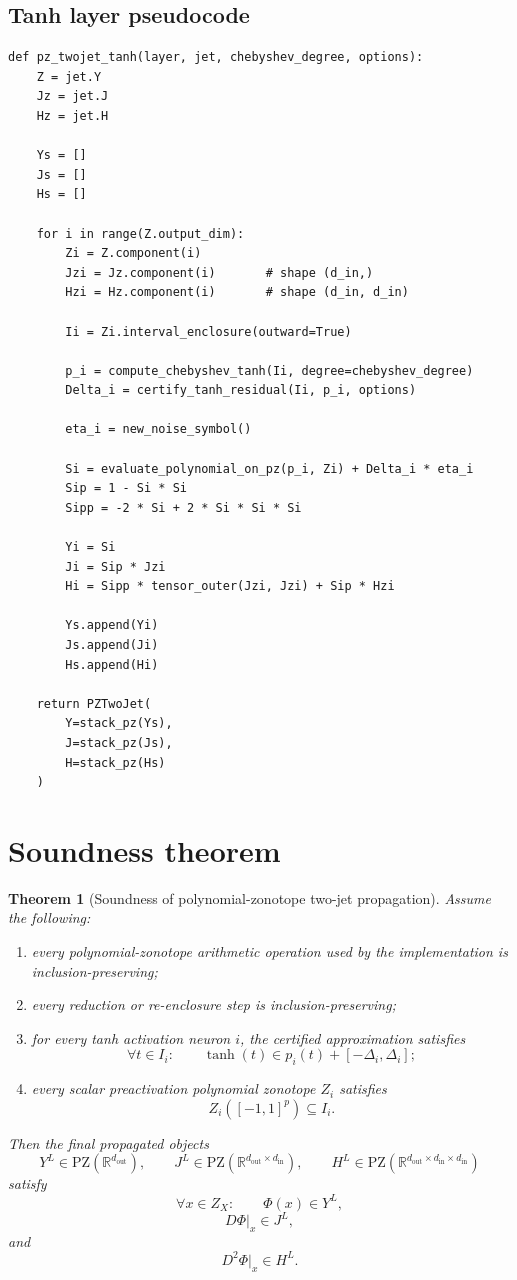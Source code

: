\documentclass[11pt]{article}
\newtheorem{theorem}[definition]{Theorem}
\newcommand{\R}{\mathbb{R}}
\newcommand{\PZ}{\mathrm{PZ}}
\begin{document}
\subsection{Tanh layer pseudocode}

\begin{verbatim}
def pz_twojet_tanh(layer, jet, chebyshev_degree, options):
    Z = jet.Y
    Jz = jet.J
    Hz = jet.H

    Ys = []
    Js = []
    Hs = []

    for i in range(Z.output_dim):
        Zi = Z.component(i)
        Jzi = Jz.component(i)       # shape (d_in,)
        Hzi = Hz.component(i)       # shape (d_in, d_in)

        Ii = Zi.interval_enclosure(outward=True)

        p_i = compute_chebyshev_tanh(Ii, degree=chebyshev_degree)
        Delta_i = certify_tanh_residual(Ii, p_i, options)

        eta_i = new_noise_symbol()

        Si = evaluate_polynomial_on_pz(p_i, Zi) + Delta_i * eta_i
        Sip = 1 - Si * Si
        Sipp = -2 * Si + 2 * Si * Si * Si

        Yi = Si
        Ji = Sip * Jzi
        Hi = Sipp * tensor_outer(Jzi, Jzi) + Sip * Hzi

        Ys.append(Yi)
        Js.append(Ji)
        Hs.append(Hi)

    return PZTwoJet(
        Y=stack_pz(Ys),
        J=stack_pz(Js),
        H=stack_pz(Hs)
    )
\end{verbatim}

\section{Soundness theorem}

\begin{theorem}[Soundness of polynomial-zonotope two-jet propagation]
Assume the following:
\begin{enumerate}[label=(\roman*)]
    \item every polynomial-zonotope arithmetic operation used by the implementation is inclusion-preserving;
    \item every reduction or re-enclosure step is inclusion-preserving;
    \item for every tanh activation neuron \(i\), the certified approximation satisfies
    \[
        \forall t\in I_i:
        \qquad
        \tanh(t)\in p_i(t)+[-\Delta_i,\Delta_i];
    \]
    \item every scalar preactivation polynomial zonotope \(Z_i\) satisfies
    \[
        Z_i([-1,1]^p)\subseteq I_i.
    \]
\end{enumerate}
Then the final propagated objects
\[
    Y^L\in\PZ(\R^{d_{\mathrm{out}}}),
    \qquad
    J^L\in\PZ(\R^{d_{\mathrm{out}}\times d_{\mathrm{in}}}),
    \qquad
    H^L\in\PZ(\R^{d_{\mathrm{out}}\times d_{\mathrm{in}}\times d_{\mathrm{in}}})
\]
satisfy
\[
    \forall x\in Z_X:
    \qquad
    \Phi(x)\in Y^L,
\]
\[
    D\Phi|_x\in J^L,
\]
and
\[
    D^2\Phi|_x\in H^L.
\]
\end{theorem}
\end{document}
